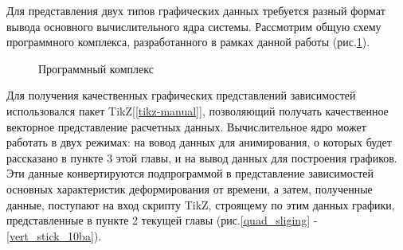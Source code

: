 Для представления двух типов графических данных требуется разный формат вывода основного вычислительного ядра системы.
Рассмотрим общую схему программного комплекса, разработанного в рамках данной работы (рис.\ref{programm}).
\begin{figure}[h!]  	
				\def\svgwidth{\columnwidth}
			\caption{ Программный комплекс } 
\label{programm}
 \end{figure}
 
 Для получения качественных графических представлений зависимостей использовался пакет TikZ[\ref{tikz-manual}],
 позволяющий получать качественное векторное представление расчетных данных. 
 Вычислительное ядро может работать в двух режимах: на вовод данных для анимирования, о которых будет рассказано в пункте 3 этой главы, и на вывод данных для построения графиков. Эти данные конвертируются подпрограммой в представление зависимостей основных характеристик деформирования от времени, а затем, полученные данные, поступают на вход скрипту TikZ, строящему по этим данных графики, представленные в пункте 2 текущей главы (рис.\ref{quad_sliging} - \ref{vert_stick_10ba}).
 
